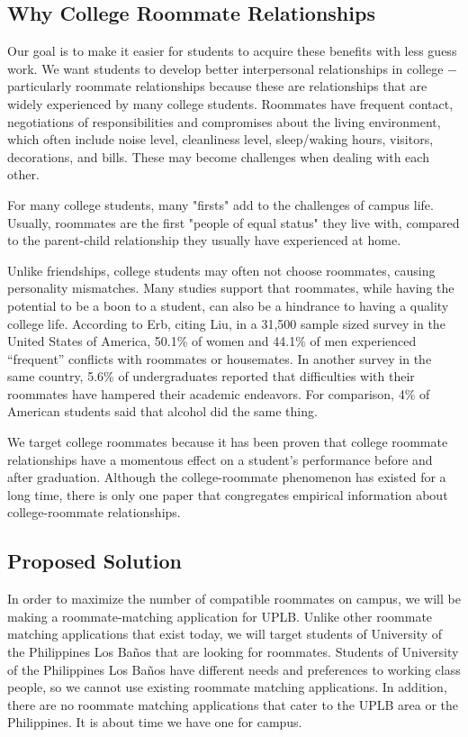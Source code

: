 \documentclass[journal]{./IEEE/IEEEtran}
\newcommand{\UPLB}{University of the Philippines Los Ba\~{n}os }
\begin{document}
    \subsection{Why College Roommate Relationships}
    Our goal is to make it easier for students to acquire these benefits with less guess work. We want students to develop better interpersonal relationships in college $-$ particularly roommate relationships because these are relationships that are widely experienced by many college students\cite{erb}. Roommates have frequent contact, negotiations of responsibilities and compromises about the living environment, which often include noise level, cleanliness level, sleep/waking hours, visitors, decorations, and bills\cite{erb}. These may become challenges when dealing with each other.

    For many college students, many {"firsts"} add to the challenges of campus life. Usually, roommates are the first {"people of equal status"} they live with, compared to the parent-child relationship they usually have experienced at home\cite{erb}.

    Unlike friendships, college students may often not choose roommates, causing personality mismatches. Many studies support that roommates, while having the potential to be a boon to a student, can also be a hindrance to having a quality college life. According to Erb\cite{erb}, citing Liu\cite{liu}, in a 31,500 sample sized survey in the United States of America, 50.1\% of women and 44.1\% of men experienced “frequent” conflicts with roommates or housemates. In another survey in the same country, 5.6\% of undergraduates reported that difficulties with their roommates have hampered their academic endeavors\cite{erb}. For comparison, 4\% of American students said that alcohol did the same thing\cite{erb}.

    We target college roommates because it has been proven that college roommate relationships have a momentous effect on a student's performance before and after graduation. Although the college-roommate phenomenon has existed for a long time, there is only one paper that congregates empirical information about college-roommate relationships\cite{erb}.

    \subsection{Proposed Solution}
    In order to maximize the number of compatible roommates on campus, we will be making a roommate-matching application for UPLB. Unlike other roommate matching applications that exist today, we will target students of \UPLB that are looking for roommates. Students of \UPLB  have different needs and preferences to working class people, so we cannot use existing roommate matching applications. In addition, there are no roommate matching applications that cater to the UPLB area or the Philippines. It is about time we have one for campus.
\pubidadjcol
\end{document}

